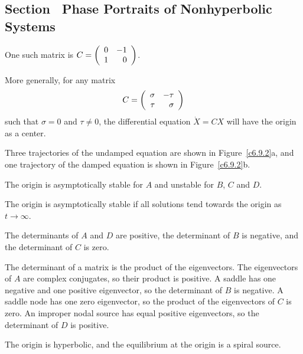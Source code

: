 \documentclass{ximera}
\begin{document}
\begin{figure}[htb]
                       \centerline{%
                       }
\end{figure}



\newpage
\subsection*{Section~\protect{\ref{S:6.9}} Phase Portraits of Nonhyperbolic
Systems}

 \ans One such matrix is $C = \left(\begin{array}{rr} 0 & -1\\ 1 &0\end{array}\right)$.

\soln More generally, for any matrix
\[
C = \left(\begin{array}{rr} \sigma & -\tau\\ \tau &\sigma\end{array}\right)
\]
such that $\sigma = 0$ and $\tau \neq 0$, the differential equation
$\dot{X} = CX$ will have the origin as a center.

Three trajectories of the undamped equation are shown in Figure~\ref{c6.9.2}a,
and one trajectory of the damped equation is shown in Figure~\ref{c6.9.2}b.

\begin{figure}[htb]
                       \centerline{%
                       }
\end{figure}

 \ans The origin is asymptotically stable for $A$ and unstable
for $B$, $C$ and $D$.

\soln The origin is asymptotically stable if all solutions tend towards
the origin as $t \rightarrow \infty$.

 \ans The determinants of $A$ and $D$ are positive, the
determinant of $B$ is negative, and the determinant of $C$ is zero.

\soln The determinant of a matrix is the product of the eigenvectors.  The
eigenvectors of $A$ are complex conjugates, so their product
is positive.  A saddle has one negative and one positive eigenvector, so
the determinant of $B$ is negative.  A saddle node has one zero
eigenvector, so the product of the eigenvectors of $C$ is zero.  An
improper nodal source has equal positive eigenvectors, so the determinant
of $D$ is positive.

\newpage
{} \ans The origin is hyperbolic, and the equilibrium at the origin
is a spiral source.
\end{document}
